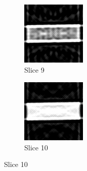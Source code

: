 \documentclass{article}
\begin{document}
\begin{figure}[t!]
\medskip
\begin{subfigure}{0.45\textwidth}
\includegraphics[width=\linewidth]{s_09.png}
\caption{Slice 9} \label{fig:c}
\end{subfigure}\hspace*{\fill}
\begin{subfigure}{0.45\textwidth}
\includegraphics[width=\linewidth]{s_10.png}
\caption{Slice 10} \label{fig:d}
\end{subfigure}


\end{figure}
\end{document}
